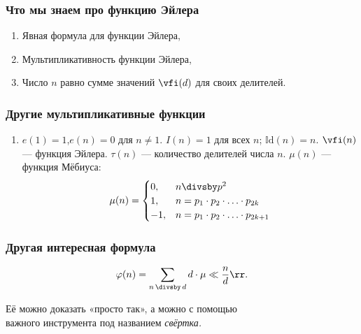 \begin{frame} \frametitle{Что мы знаем про функцию Эйлера}
   \begin{enumerate}
	\item Явная формула для функции Эйлера,\vspace{0.6cm}
	\item Мультипликативность функции Эйлера,\vspace{0.6cm}
	\item Число $n$ равно сумме значений $\vfi (d)$ для своих делителей.
   \end{enumerate}
\end{frame}

\begin{frame} \frametitle{Другие мультипликативные функции}
   \begin{enumerate}
	\item $e(1) = 1$,\quad $e(n) = 0$ для $n \ne 1$.
	\litem $I(n) = 1$ для всех $n$;\hspace{1.2cm} $\mathbb{I}\mathrm{d} (n) = n$.
	\litem $\vfi(n)$ — функция Эйлера.
	\litem $\tau(n)$ — количество делителей числа $n$.
	\litem $\mu(n)$ — функция Мёбиуса:
	   \[ \mu(n) = \begin{cases}
		0, & n \divsby p^2 \\
		1, & n = p_1 \cdot p_2 \cdot\ldots\cdot p_{2k} \\
		-1, & n = p_1 \cdot p_2 \cdot\ldots\cdot p_{2k+1} \\
	   \end{cases} \]
   \end{enumerate}
\end{frame}

\begin{frame} \frametitle{Другая интересная формула}
     \begin{theorem} \vspace{-1.5mm}
	\[\varphi(n) = \sum\limits_{n\,\divsby\,d} d \cdot \mu \ll\frac{n}{d}\rr.\] \vspace{-0.5mm}
     \end{theorem} \vspace{0.5cm}

	Её можно доказать «просто так», а можно с помощью\\ важного инструмента под названием {\it свёртка.}
\end{frame}
